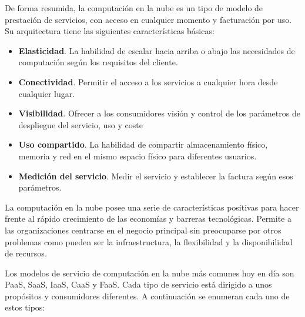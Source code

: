 De forma resumida, la computación en la nube es un tipo de modelo de prestación de servicios, con acceso en cualquier momento y facturación por uso. Su arquitectura tiene las siguientes características básicas:

\begin{itemize}
    \item \textbf{Elasticidad}. La habilidad de escalar hacia arriba o abajo las necesidades de computación según los requisitos del cliente.
    \item \textbf{Conectividad}. Permitir el acceso a los servicios a cualquier hora desde cualquier lugar.
    \item \textbf{Visibilidad}. Ofrecer a los consumidores visión y control de los parámetros de despliegue del servicio, uso y coste
    \item \textbf{Uso compartido}. La habilidad de compartir almacenamiento físico, memoria y red en el mismo espacio físico para diferentes usuarios.
    \item \textbf{Medición del servicio}. Medir el servicio y establecer la factura según esos parámetros.
\end{itemize}

La computación en la nube posee una serie de características positivas para hacer frente al rápido crecimiento de las economías y barreras tecnológicas. Permite a las organizaciones centrarse en el negocio principal sin preocuparse por otros problemas como pueden ser la infraestructura, la flexibilidad y la disponibilidad de recursos.

Los modelos de servicio de computación en la nube más comunes hoy en día son PaaS, SaaS, IaaS, CaaS y FaaS. Cada tipo de servicio está dirigido a unos propósitos y consumidores diferentes. A continuación se enumeran cada uno de estos tipos:

